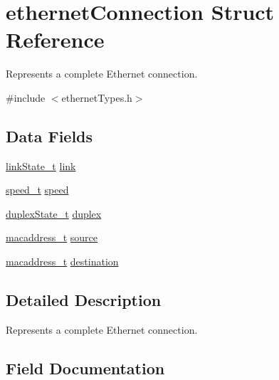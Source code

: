\hypertarget{structethernet_connection}{}\section{ethernet\+Connection Struct Reference}
\label{structethernet_connection}


Represents a complete Ethernet connection.  




{\ttfamily \#include $<$ethernet\+Types.\+h$>$}

\subsection*{Data Fields}
\begin{DoxyCompactItemize}
\item 
\mbox{\hyperlink{group__ethernet_ga0e02d2c1291711df8a3ffc6f5c8aab98}{link\+State\+\_\+t}} \mbox{\hyperlink{structethernet_connection_aa60601bbd1233e0023f0bc6680d27664}{link}}
\item 
\mbox{\hyperlink{group__ethernet_gaf44917bbf64327b78826bc2f74266af8}{speed\+\_\+t}} \mbox{\hyperlink{structethernet_connection_abe17b4998b5f32ec626dfd11c84a2c07}{speed}}
\item 
\mbox{\hyperlink{group__ethernet_gaf88782ec3aef6eb80f7fb5bcc4fb1401}{duplex\+State\+\_\+t}} \mbox{\hyperlink{structethernet_connection_a752e08675335172de04d33b15511d236}{duplex}}
\item 
\mbox{\hyperlink{group__ethernet_gacb865bcbf50a6c8cef05581bfabff373}{macaddress\+\_\+t}} \mbox{\hyperlink{structethernet_connection_ac7fb066288966b4472abc9833d8d42a0}{source}}
\item 
\mbox{\hyperlink{group__ethernet_gacb865bcbf50a6c8cef05581bfabff373}{macaddress\+\_\+t}} \mbox{\hyperlink{structethernet_connection_a93751f769ad8a61045bf9ed5c00501d6}{destination}}
\end{DoxyCompactItemize}


\subsection{Detailed Description}
Represents a complete Ethernet connection. 

\subsection{Field Documentation}
\mbox{\label{structethernet_connection_a93751f769ad8a61045bf9ed5c00501d6}} 
